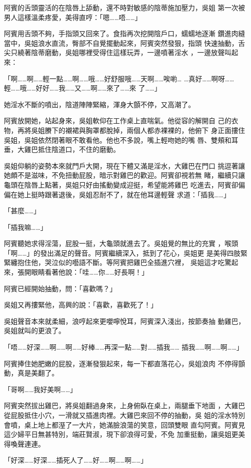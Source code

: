 阿賓的舌頭靈活的在陰唇上舔動，還不時對敏感的陰蒂施加壓力，吳姐
第一次被男人這樣溫柔疼愛，美得直哼：「嗯……唔……」

阿賓用舌頭不夠，手指頭又回來了。食指再次挖開陰戶口，蠕蠕地逐漸
鑽進肉縫當中，吳姐浪水直流，臀部不自覺擺動起來，阿賓突然發狠，指頭
快速抽動，舌尖只繞著陰蒂磨動，吳姐哪裡受得住這樣玩弄，一邊噴著淫水
，一邊放聲叫起來：

「啊……啊……輕一點……啊……哦……好舒服哦……天啊……唉喲…
…真好……啊呀……輕……哦……好好……我……又……啊……來了……來
了……」

她淫水不斷的噴出，陰道陣陣緊縮，渾身大顫不停，又高潮了。

阿賓放開她，站起身來，吳姐軟仰在工作桌上直喘氣。他從容的解開自
己的衣物，再將吳姐賸下的襯裙與胸罩都脫掉，兩個人都赤裸裸的，他俯下
身正面摟住吳姐，吳姐依然閉著眼不敢看他。他也不多說，嘴上輕吻她的嘴
唇、雙頰和耳垂，大雞巴抵住陰道口，不住的磨動。

吳姐仰躺的姿勢本來就門戶大開，現在下體又滿是淫水，大雞巴在門口
挑逗著讓她頗不是滋味，不免扭動屁股，暗示對雞巴的歡迎。阿賓卻視若無
睹，繼續只讓龜頭在陰唇上點著，吳姐只好由搖動變成迎挺，希望能將雞巴
吃進去，阿賓卻偏偏在她上挺時跟著退後，吳姐忍耐不了，就在他耳邊輕聲
求道：「插我……」

「甚麼……」

「插我嘛……」

阿賓聽她求得淫蕩，屁股一挺，大龜頭就進去了。吳姐覺的無比的充實
，喉頭「啊……」的發出滿足的聲音。阿賓繼續深入，抵到了花心，吳姐更
是美得四肢緊緊纏抱住他，哭泣似的囈語不斷。等阿賓把雞巴全插進穴裡，
吳姐這才吃驚起來，張開眼睛看著他說：「哇……你……好長啊！」

阿賓已經開始抽動，問：「喜歡嗎？」

吳姐又再摟緊他，高興的說：「喜歡，喜歡死了！」

吳姐聲音本來就柔細，浪哼起來更嚶嚀悅耳，阿賓深入淺出，按節奏抽
動雞巴，吳姐就叫的更浪了。

「唔……好深……啊……啊……好棒……再深一點……對……插我……
插我……啊……啊……」

阿賓捧住她肥嫩的屁股，逐漸發狠起來，每一下都直落花心，吳姐浪肉
不停得顫動，真是美翻了。

「哥啊……我好美啊……」

阿賓突然拔出雞巴，將吳姐翻過身來，上身俯臥在桌上，兩腿垂下地面
，大雞巴從屁股抵住小穴，一滑就又插進肉裡。大雞巴來回不停的抽動，吳
姐的淫水特別會噴，桌上地上都溼了一大片，她滿臉浪蕩的笑意，回頭雙眼
直勾阿賓。阿賓見這少婦平日無甚特別，端莊賢淑，現下卻浪得可愛，不免
加重挺動，讓吳姐更美得喚聲連連。

「好深……好深……插死人了……好……啊……啊……」

